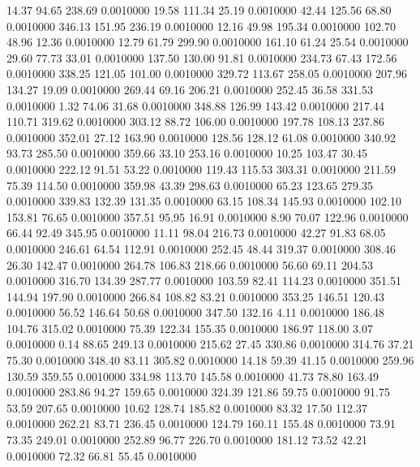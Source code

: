   14.37   94.65  238.69   0.0010000
  19.58  111.34   25.19   0.0010000
  42.44  125.56   68.80   0.0010000
 346.13  151.95  236.19   0.0010000
  12.16   49.98  195.34   0.0010000
 102.70   48.96   12.36   0.0010000
  12.79   61.79  299.90   0.0010000
 161.10   61.24   25.54   0.0010000
  29.60   77.73   33.01   0.0010000
 137.50  130.00   91.81   0.0010000
 234.73   67.43  172.56   0.0010000
 338.25  121.05  101.00   0.0010000
 329.72  113.67  258.05   0.0010000
 207.96  134.27   19.09   0.0010000
 269.44   69.16  206.21   0.0010000
 252.45   36.58  331.53   0.0010000
   1.32   74.06   31.68   0.0010000
 348.88  126.99  143.42   0.0010000
 217.44  110.71  319.62   0.0010000
 303.12   88.72  106.00   0.0010000
 197.78  108.13  237.86   0.0010000
 352.01   27.12  163.90   0.0010000
 128.56  128.12   61.08   0.0010000
 340.92   93.73  285.50   0.0010000
 359.66   33.10  253.16   0.0010000
  10.25  103.47   30.45   0.0010000
 222.12   91.51   53.22   0.0010000
 119.43  115.53  303.31   0.0010000
 211.59   75.39  114.50   0.0010000
 359.98   43.39  298.63   0.0010000
  65.23  123.65  279.35   0.0010000
 339.83  132.39  131.35   0.0010000
  63.15  108.34  145.93   0.0010000
 102.10  153.81   76.65   0.0010000
 357.51   95.95   16.91   0.0010000
   8.90   70.07  122.96   0.0010000
  66.44   92.49  345.95   0.0010000
  11.11   98.04  216.73   0.0010000
  42.27   91.83   68.05   0.0010000
 246.61   64.54  112.91   0.0010000
 252.45   48.44  319.37   0.0010000
 308.46   26.30  142.47   0.0010000
 264.78  106.83  218.66   0.0010000
  56.60   69.11  204.53   0.0010000
 316.70  134.39  287.77   0.0010000
 103.59   82.41  114.23   0.0010000
 351.51  144.94  197.90   0.0010000
 266.84  108.82   83.21   0.0010000
 353.25  146.51  120.43   0.0010000
  56.52  146.64   50.68   0.0010000
 347.50  132.16    4.11   0.0010000
 186.48  104.76  315.02   0.0010000
  75.39  122.34  155.35   0.0010000
 186.97  118.00    3.07   0.0010000
   0.14   88.65  249.13   0.0010000
 215.62   27.45  330.86   0.0010000
 314.76   37.21   75.30   0.0010000
 348.40   83.11  305.82   0.0010000
  14.18   59.39   41.15   0.0010000
 259.96  130.59  359.55   0.0010000
 334.98  113.70  145.58   0.0010000
  41.73   78.80  163.49   0.0010000
 283.86   94.27  159.65   0.0010000
 324.39  121.86   59.75   0.0010000
  91.75   53.59  207.65   0.0010000
  10.62  128.74  185.82   0.0010000
  83.32   17.50  112.37   0.0010000
 262.21   83.71  236.45   0.0010000
 124.79  160.11  155.48   0.0010000
  73.91   73.35  249.01   0.0010000
 252.89   96.77  226.70   0.0010000
 181.12   73.52   42.21   0.0010000
  72.32   66.81   55.45   0.0010000

